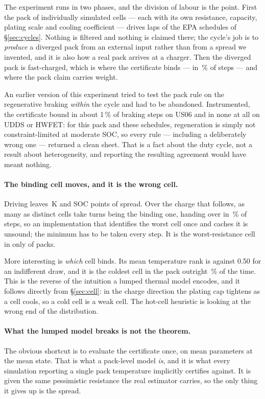 \documentclass[11pt,letterpaper]{article}
\theoremstyle{definition}
\theoremstyle{remark}
\begin{document}
The experiment runs in two phases, and the division of labour is the point. First the pack of
\qCells{} individually simulated cells --- each with its own resistance, capacity, plating scale
and cooling coefficient --- drives \qLaps{} laps of the EPA schedules of \S\ref{sec:cycles}.
Nothing is filtered and nothing is claimed there; the cycle's job is to \emph{produce} a
diverged pack from an external input rather than from a spread we invented, and it is also how
a real pack arrives at a charger. Then the diverged pack is fast-charged, which is where the
certificate binds --- in \qBind\,\% of steps --- and where the pack claim carries weight.

An earlier version of this experiment tried to test the pack rule on the regenerative braking
\emph{within} the cycle and had to be abandoned. Instrumented, the certificate bound in about
1\,\% of braking steps on US06 and in none at all on UDDS or HWFET: for this pack and these
schedules, regeneration is simply not constraint-limited at moderate SOC, so every rule ---
including a deliberately wrong one --- returned a clean sheet. That is a fact about the duty
cycle, not a result about heterogeneity, and reporting the resulting agreement would have meant
nothing.

\paragraph{The binding cell moves, and it is the wrong cell.} Driving leaves \qSpreadT\,K and
\qSpreadSoc{} SOC points of spread. Over the charge that follows, as many as \qDistinct{}
distinct cells take turns being the binding one, handing over in \qSwitchRate\,\% of steps, so
an implementation that identifies the worst cell once and caches it is unsound; the minimum has
to be taken every step. It is the worst-resistance cell in only \qWorstParam{} of \qPacks{}
packs.

More interesting is \emph{which} cell binds. Its mean temperature rank is \qRank{} against 0.50
for an indifferent draw, and it is the coldest cell in the pack outright \qColdest\,\% of the
time. This is the reverse of the intuition a lumped thermal model encodes, and it follows
directly from \S\ref{sec:cell}: in the charge direction the plating cap tightens as a cell
cools, so a cold cell is a weak cell. The hot-cell heuristic is looking at the wrong end of the
distribution.

\paragraph{What the lumped model breaks is not the theorem.} The obvious shortcut is to evaluate
the certificate once, on mean parameters at the mean state. That is what a pack-level model
\emph{is}, and it is what every simulation reporting a single pack temperature implicitly
certifies against. It is given the same pessimistic resistance the real estimator carries, so
the only thing it gives up is the spread.
\end{document}
